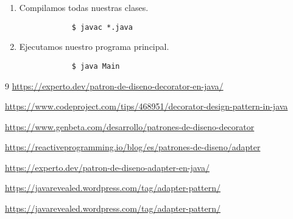 \documentclass[letterpaper,11pt]{article}
\begin{document}
\begin{enumerate}
\begin{enumerate}
        \item Compilamos todas nuestras clases.
        \begin{verbatim}
            $ javac *.java
        \end{verbatim}

        \item Ejecutamos nuestro programa principal.
        \begin{verbatim}
            $ java Main 
        \end{verbatim}
    \end{enumerate}

    \begin{thebibliography} {9}
        \url{https://experto.dev/patron-de-diseno-decorator-en-java/}

        \url{https://www.codeproject.com/tips/468951/decorator-design-pattern-in-java}
        
        \url{https://www.genbeta.com/desarrollo/patrones-de-diseno-decorator}

        \url{https://reactiveprogramming.io/blog/es/patrones-de-diseno/adapter}

        \url{https://experto.dev/patron-de-diseno-adapter-en-java/}

        \url{https://javarevealed.wordpress.com/tag/adapter-pattern/}

        \url{https://javarevealed.wordpress.com/tag/adapter-pattern/}
    \end{thebibliography}
\end{enumerate}
\end{document}
